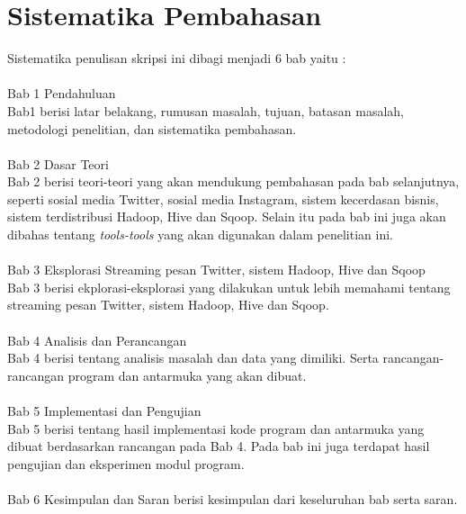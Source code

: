 \section{Sistematika Pembahasan}
\label{sec:sistematika_pembahasan}
Sistematika penulisan skripsi ini dibagi menjadi 6 bab yaitu :\\
 \\
Bab 1 Pendahuluan\\ 
Bab1 berisi latar belakang, rumusan masalah, tujuan, batasan masalah, metodologi penelitian, dan sistematika pembahasan.
\\\\
Bab 2 Dasar Teori\\
Bab 2 berisi teori-teori yang akan mendukung pembahasan pada bab selanjutnya, seperti sosial media Twitter, sosial media Instagram, sistem kecerdasan bisnis, sistem terdistribusi Hadoop, Hive dan Sqoop. Selain itu pada bab ini juga akan dibahas tentang \textit{tools-tools} yang akan digunakan dalam penelitian ini.
\\\\
Bab 3 Eksplorasi Streaming pesan Twitter, sistem Hadoop, Hive dan Sqoop\\
Bab 3 berisi ekplorasi-eksplorasi yang dilakukan untuk lebih memahami tentang streaming pesan Twitter, sistem Hadoop, Hive dan Sqoop.
\\\\
Bab 4 Analisis dan Perancangan\\
Bab 4 berisi tentang analisis masalah dan data yang dimiliki. Serta rancangan-rancangan program dan antarmuka yang akan dibuat.
\\\\
Bab 5 Implementasi dan Pengujian\\
Bab 5 berisi tentang hasil implementasi kode program dan antarmuka yang dibuat berdasarkan rancangan pada Bab 4. Pada bab ini juga terdapat hasil pengujian dan eksperimen modul program.
\\\\
Bab 6 Kesimpulan dan Saran berisi kesimpulan dari keseluruhan bab serta saran.\\
